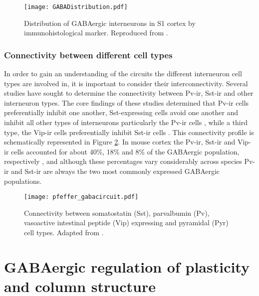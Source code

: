 \begin{figure}
	\centering
        \texttt{[image: GABADistribution.pdf]}
	\caption{Distribution of GABAergic interneurons in S1 cortex by
      immunohistological marker. Reproduced from \cite{Rudy2011}.}
	\label{GABADistribution}
\end{figure}

\subsubsection{Connectivity between different cell types}

In order to gain an understanding of the circuits the different
interneuron cell types are involved in, it is important to consider
their interconnectivity. Several studies have sought to determine the
connectivity between Pv-ir, Sst-ir and other interneuron types. The
core findings of these studies determined that Pv-ir cells
preferentially inhibit one another, Sst-expressing cells avoid one
another and inhibit all other types of interneurons particularly the
Pv-ir cells \citep{Xu2013}, while a third type, the Vip-ir cells
preferentially inhibit Sst-ir cells \citep{Pfeffer2013}. This
connectivity profile is schematically represented in Figure
\ref{gaba_circuit}. In mouse cortex the Pv-ir, Sst-ir and Vip-ir cells
accounted for about 40\%, 18\% and 8\% of the GABAergic population,
respectively \citep{Xu2010}, and although these percentages vary
considerably across species Pv-ir and Sst-ir are always the two most
commonly expressed GABAergic populations.

\begin{figure}
	\centering
        \texttt{[image: pfeffer\_gabacircuit.pdf]}
	\caption{Connectivity between somatostatin (Sst),
        parvalbumin (Pv), vasoactive intestinal peptide (Vip)
        expressing and pyramidal (Pyr) cell types. Adapted from
        \cite{Pfeffer2013}.}
	\label{gaba_circuit}
\end{figure}

\section{GABAergic regulation of plasticity and column structure}

